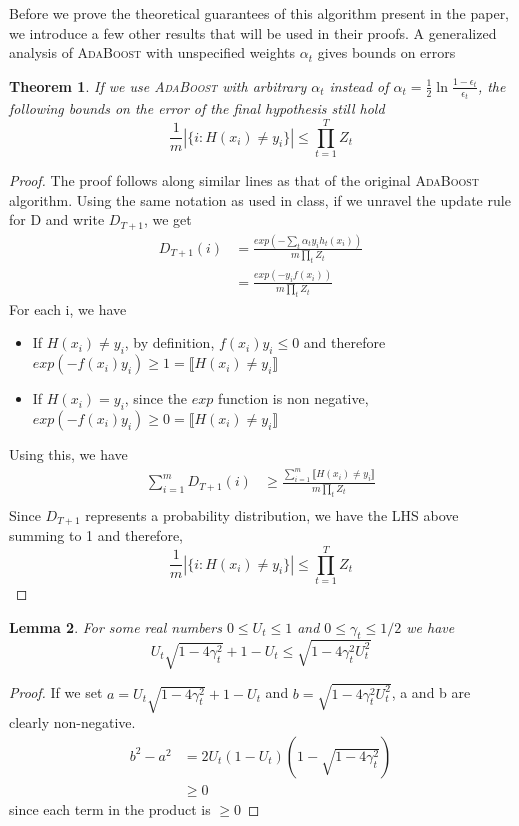 \documentclass[11pt]{article}
\newtheorem{theorem}{Theorem}
\newtheorem{lemma}[theorem]{Lemma}
\begin{document}
Before we prove the theoretical guarantees of this algorithm present in the paper, we introduce a few other results that will be used in their proofs. 
A generalized analysis of \textsc{AdaBoost} with unspecified weights $\alpha_t$  \cite{Schapire:1999:IBA:337859.337870} gives bounds on errors
\begin{theorem}
If we use \textsc{AdaBoost} with arbitrary $\alpha_t$ instead of $\alpha_t = \frac{1}{2} \ln \frac{1-\epsilon_t}{\epsilon_t}$, the following bounds on the error of the final hypothesis still hold
$$\frac{1}{m}|\{i : H(x_i) \neq y_i\}| \le \prod_{t=1}^T Z_t$$
\end{theorem}
\begin{proof}
The proof follows along similar lines as that of the original \textsc{AdaBoost} algorithm. Using the same notation as used in class, if we unravel the update rule for D and write $D_{T+1}$, we get
\begin{align*}
D_{T+1}(i) &= \frac{exp(-\sum_t \alpha_t y_i h_t(x_i))}{m\prod_t Z_t}\\
&= \frac{exp(-y_i f(x_i))}{m \prod_t Z_t}
\end{align*}
For each i, we have
\begin{itemize}
\item If $H(x_i) \neq y_i$, by definition, $f(x_i) y_i \leq 0$ and therefore $exp(-f(x_i) y_i) \ge 1 = \llbracket H(x_i) \neq y_i \rrbracket$
\item If $H(x_i) = y_i$, since the $exp$ function is non negative, $exp(-f(x_i) y_i) \ge 0 = \llbracket H(x_i) \neq y_i \rrbracket$
\end{itemize}
Using this, we have
\begin{align*}
\sum_{i=1}^m D_{T+1}(i) &\ge \frac{\sum_{i=1}^m \llbracket H(x_i) \neq y_i \rrbracket}{m\prod_t Z_t}\\ 
\end{align*}
Since $D_{T+1}$ represents a probability distribution, we have the LHS above summing to 1 and therefore,
$$\frac{1}{m}|\{i : H(x_i) \neq y_i\}| \le \prod_{t=1}^T Z_t$$
\end{proof}

\begin{lemma} \label{lemma10}
For some real numbers $0 \le U_t \le 1$ and $0 \le \gamma_t \le 1/2$ we have $$U_t \sqrt{1-4\gamma_t^2} + 1-U_t \le \sqrt{1-4\gamma_t^2U_t^2}$$
\end{lemma}
\begin{proof}
If we set $a = U_t \sqrt{1-4\gamma_t^2} + 1-U_t$ and $b = \sqrt{1-4\gamma_t^2U_t^2}$, a and b are clearly non-negative. 
\begin{align*}
b^2-a^2 &= 2U_t(1-U_t)(1-\sqrt{1-4\gamma_t^2})\\
&\ge 0
\end{align*}
since each term in the product is $\ge 0$
\end{proof}
\end{document}
